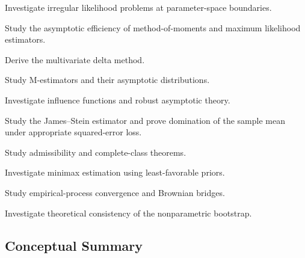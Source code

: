 \begin{exercise}[4]
Investigate irregular likelihood problems at parameter-space boundaries.
\end{exercise}

\begin{exercise}[4]
Study the asymptotic efficiency of method-of-moments and maximum
likelihood estimators.
\end{exercise}

\begin{exercise}[4]
Derive the multivariate delta method.
\end{exercise}

\begin{exercise}[4]
Study M-estimators and their asymptotic distributions.
\end{exercise}

\begin{exercise}[4]
Investigate influence functions and robust asymptotic theory.
\end{exercise}

\begin{exercise}[4]
Study the James--Stein estimator and prove domination of the sample mean
under appropriate squared-error loss.
\end{exercise}

\begin{exercise}[4]
Study admissibility and complete-class theorems.
\end{exercise}

\begin{exercise}[4]
Investigate minimax estimation using least-favorable priors.
\end{exercise}

\begin{exercise}[4]
Study empirical-process convergence and Brownian bridges.
\end{exercise}

\begin{exercise}[4]
Investigate theoretical consistency of the nonparametric bootstrap.
\end{exercise}

\subsection{Conceptual Summary}
\label{subsec:mathematical-statistics-summary}

